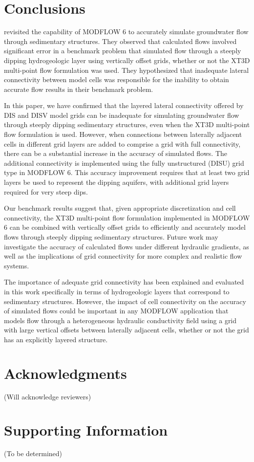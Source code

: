 \documentclass{article}
\begin{document}
\section{Conclusions}

\cite{bardot2022} revisited the capability of MODFLOW 6 to accurately simulate groundwater flow through sedimentary structures. They observed that calculated flows involved significant error in a benchmark problem that simulated flow through a steeply dipping hydrogeologic layer using vertically offset grids, whether or not the XT3D multi-point flow formulation was used. They hypothesized that inadequate lateral connectivity between model cells was responsible for the inability to obtain accurate flow results in their benchmark problem.

In this paper, we have confirmed that the layered lateral connectivity offered by DIS and DISV model grids can be inadequate for simulating groundwater flow through steeply dipping sedimentary structures, even when the XT3D multi-point flow formulation is used.  However, when connections between laterally adjacent cells in different grid layers are added to comprise a grid with full connectivity, there can be a substantial increase in the accuracy of simulated flows.  The additional connectivity is implemented using the fully unstructured (DISU) grid type in MODFLOW 6. This accuracy improvement requires that at least two grid layers be used to represent the dipping aquifers, with additional grid layers required for very steep dips.

Our benchmark results suggest that, given appropriate discretization and cell connectivity, the XT3D multi-point flow formulation implemented in MODFLOW 6 can be combined with vertically offset grids to efficiently and accurately model flows through steeply dipping sedimentary structures. Future work may investigate the accuracy of calculated flows under different hydraulic gradients, as well as the implications of grid connectivity for more complex and realistic flow systems.

The importance of adequate grid connectivity has been explained and evaluated in this work specifically in terms of hydrogeologic layers that correspond to sedimentary structures. However, the impact of cell connectivity on the accuracy of simulated flows could be important in any MODFLOW application that models flow through a heterogeneous hydraulic conductivity field using a grid with large vertical offsets between laterally adjacent cells, whether or not the grid has an explicitly layered structure.

\section{Acknowledgments}
{\color{red} (Will acknowledge reviewers)}

\section{Supporting Information}
{\color{red} (To be determined)}


\end{document}

